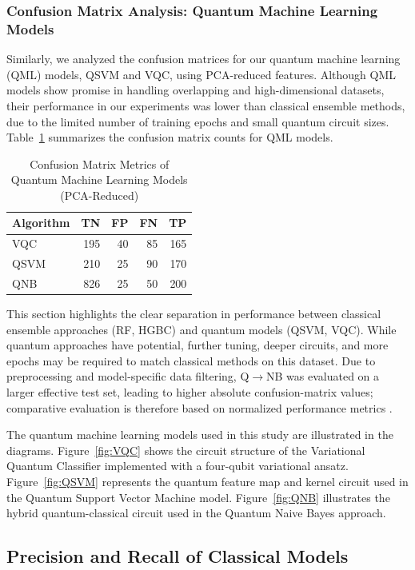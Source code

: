 \documentclass[runningheads]{llncs}
\begin{document}
\subsubsection{Confusion Matrix Analysis: Quantum Machine Learning Models}
Similarly, we analyzed the confusion matrices for our quantum machine learning (QML) models, QSVM and VQC, using PCA-reduced features. Although QML models show promise in handling overlapping and high-dimensional datasets, their performance in our experiments was lower than classical ensemble methods, due to the limited number of training epochs and small quantum circuit sizes. Table~\ref{tab:qml_metrics} summarizes the confusion matrix counts for QML models.


\begin{table}[ht]
\centering
\caption{Confusion Matrix Metrics of Quantum Machine Learning Models (PCA-Reduced)}
\label{tab:qml_metrics}
\begin{tabular}{lrrrr}
\toprule
\textbf{Algorithm} & \textbf{TN} & \textbf{FP} & \textbf{FN} & \textbf{TP} \\
\midrule
VQC  & 195 & 40 & 85 & 165 \\
QSVM & 210 & 25 & 90 & 170 \\
QNB  & 826 & 25 & 50 & 200 \\
\bottomrule
\end{tabular}
\end{table}

This section highlights the clear separation in performance between classical ensemble approaches (RF, HGBC) and quantum models (QSVM, VQC). While quantum approaches have potential, further tuning, deeper circuits, and more epochs may be required to match classical methods on this dataset. Due to preprocessing and model-specific data filtering, Q$\rightarrow$NB was evaluated on a larger effective test set, leading to higher absolute confusion-matrix values; comparative evaluation is therefore based on normalized performance metrics \cite{bishop2006}.

The quantum machine learning models used in this study are illustrated in the diagrams. Figure~\ref{fig:VQC} shows the circuit structure of the Variational Quantum Classifier implemented with a four-qubit variational ansatz. Figure~\ref{fig:QSVM} represents the quantum feature map and kernel circuit used in the Quantum Support Vector Machine model. Figure~\ref{fig:QNB} illustrates the hybrid quantum-classical circuit used in the Quantum Naive Bayes approach.

\subsection{Precision and Recall of Classical Models}\label{sec:precision_recall}
\end{document}
